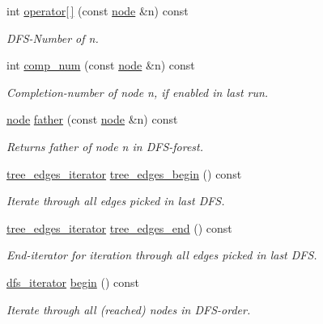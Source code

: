 \begin{DoxyCompactItemize}
int \mbox{\hyperlink{classdfs_a014b90894a47fa5abb7f4e5030be2c3e}{operator\mbox{[}$\,$\mbox{]}}} (const \mbox{\hyperlink{classnode}{node}} \&n) const
\begin{DoxyCompactList}\small\item\em D\+F\+S-\/\+Number of {\itshape n}. \end{DoxyCompactList}\item 
int \mbox{\hyperlink{classdfs_aceb066c806cb0beb5688b167a17387c7}{comp\+\_\+num}} (const \mbox{\hyperlink{classnode}{node}} \&n) const
\begin{DoxyCompactList}\small\item\em Completion-\/number of node {\itshape n}, if enabled in last run. \end{DoxyCompactList}\item 
\mbox{\hyperlink{classnode}{node}} \mbox{\hyperlink{classdfs_a3012717ce541b3e56943e2c2c50efdf6}{father}} (const \mbox{\hyperlink{classnode}{node}} \&n) const
\begin{DoxyCompactList}\small\item\em Returns father of node {\itshape n} in D\+F\+S-\/forest. \end{DoxyCompactList}\item 
\mbox{\hyperlink{classdfs_accde8d5403404f6d22fe4756d4ffedd5}{tree\+\_\+edges\+\_\+iterator}} \mbox{\hyperlink{classdfs_afe193938a05b114870c19163731273c8}{tree\+\_\+edges\+\_\+begin}} () const
\begin{DoxyCompactList}\small\item\em Iterate through all edges picked in last D\+FS. \end{DoxyCompactList}\item 
\mbox{\hyperlink{classdfs_accde8d5403404f6d22fe4756d4ffedd5}{tree\+\_\+edges\+\_\+iterator}} \mbox{\hyperlink{classdfs_ad1b9f759569cb52ba7ee415862c79831}{tree\+\_\+edges\+\_\+end}} () const
\begin{DoxyCompactList}\small\item\em End-\/iterator for iteration through all edges picked in last D\+FS. \end{DoxyCompactList}\item 
\mbox{\hyperlink{classdfs_a15fe023a5a1f7ddda00f3d87110d9a32}{dfs\+\_\+iterator}} \mbox{\hyperlink{classdfs_ab06650dd8cbd5e76b0c73b71458ec5ec}{begin}} () const
\begin{DoxyCompactList}\small\item\em Iterate through all (reached) nodes in D\+F\+S-\/order. \end{DoxyCompactList}\item 

\end{DoxyCompactItemize}
